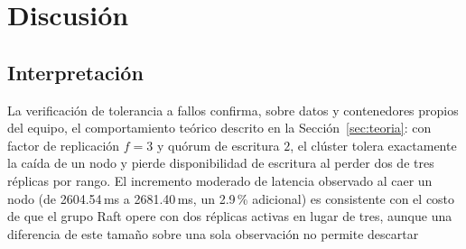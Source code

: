 \documentclass[10pt,twocolumn]{article}
\begin{document}
\section{Discusión}
\label{sec:discusion}

\subsection{Interpretación}

La verificación de tolerancia a fallos confirma, sobre datos y
contenedores propios del equipo, el comportamiento teórico descrito en la
Sección~\ref{sec:teoria}: con factor de replicación $f=3$ y quórum de
escritura $2$, el clúster tolera exactamente la caída de un nodo y pierde
disponibilidad de escritura al perder dos de tres réplicas por rango. El
incremento moderado de latencia observado al caer un nodo (de 2604.54\,ms a
2681.40\,ms, un 2.9\,\% adicional) es consistente con el costo de que el
grupo Raft opere con dos réplicas activas en lugar de tres, aunque una
diferencia de este tamaño sobre una sola observación no permite descartar
\end{document}
